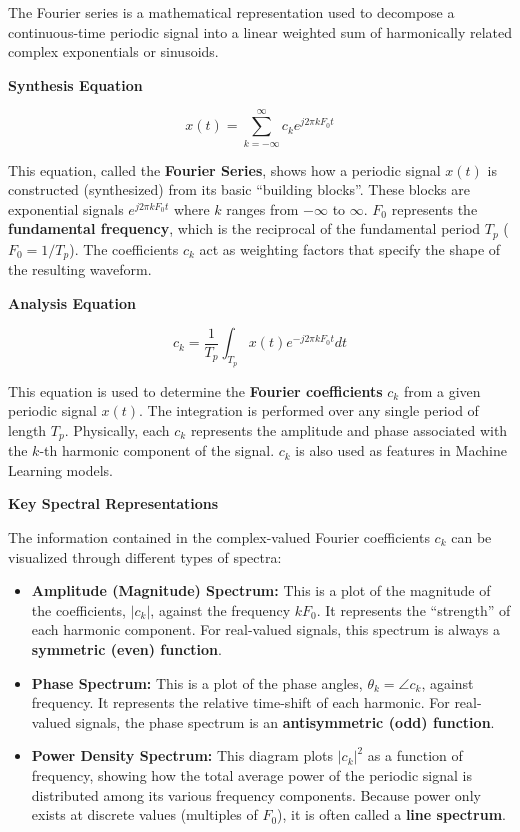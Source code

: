 The Fourier series is a mathematical representation used to decompose a
continuous-time periodic signal into a linear weighted sum of
harmonically related complex exponentials or sinusoids.

\textbf{Synthesis Equation}

\[x(t) = \sum_{k=-\infty}^{\infty} c_k e^{j2\pi k F_0 t}\]

This equation, called the \textbf{Fourier Series}, shows how a periodic
signal \(x(t)\) is constructed (synthesized) from its basic ``building
blocks''. These blocks are exponential signals \({e^{j2\pi k F_0 t}}\)
where \(k\) ranges from \(-\infty\) to \(\infty\). \(F_0\) represents
the \textbf{fundamental frequency}, which is the reciprocal of the
fundamental period \(T_p\) (\(F_0 = 1/T_p\)). The coefficients \(c_k\)
act as weighting factors that specify the shape of the resulting
waveform.

\textbf{Analysis Equation}

\[c_k = \frac{1}{T_p} \int_{T_p} x(t) e^{-j2\pi k F_0 t} dt\]

This equation is used to determine the \textbf{Fourier coefficients}
\(c_k\) from a given periodic signal \(x(t)\). The integration is
performed over any single period of length \(T_p\). Physically, each
\(c_k\) represents the amplitude and phase associated with the \(k\)-th
harmonic component of the signal. \(c_k\) is also used as features in
Machine Learning models.

\textbf{Key Spectral Representations}

The information contained in the complex-valued Fourier coefficients
\({c_k}\) can be visualized through different types of spectra:

\begin{itemize}
\tightlist
\item
  \textbf{Amplitude (Magnitude) Spectrum:} This is a plot of the
  magnitude of the coefficients, \({|c_k|}\), against the frequency
  \(kF_0\). It represents the ``strength'' of each harmonic component.
  For real-valued signals, this spectrum is always a \textbf{symmetric
  (even) function}.
\item
  \textbf{Phase Spectrum:} This is a plot of the phase angles,
  \({\theta_k = \angle c_k}\), against frequency. It represents the
  relative time-shift of each harmonic. For real-valued signals, the
  phase spectrum is an \textbf{antisymmetric (odd) function}.
\item
  \textbf{Power Density Spectrum:} This diagram plots \({|c_k|^2}\) as a
  function of frequency, showing how the total average power of the
  periodic signal is distributed among its various frequency components.
  Because power only exists at discrete values (multiples of \(F_0\)),
  it is often called a \textbf{line spectrum}.
\end{itemize}

